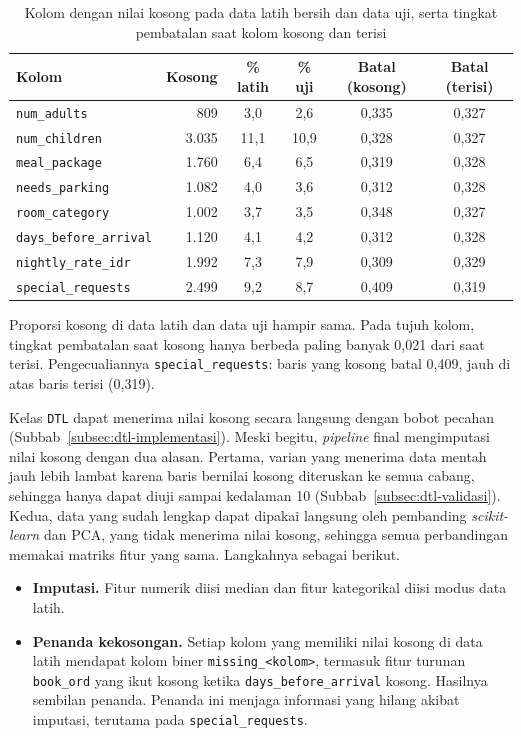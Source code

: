\begin{table}[H]
	\centering
	\caption{Kolom dengan nilai kosong pada data latih bersih dan data uji, serta tingkat pembatalan saat kolom kosong dan terisi}
	\label{tab:dtl-missing}
	\small
	\begin{tabular}{l r c c c c}
		\toprule
		\textbf{Kolom} & \textbf{Kosong} & \textbf{\% latih} & \textbf{\% uji} & \textbf{Batal (kosong)} & \textbf{Batal (terisi)} \\
		\midrule
		\texttt{num\_adults} & 809 & 3,0 & 2,6 & 0,335 & 0,327 \\
		\texttt{num\_children} & 3.035 & 11,1 & 10,9 & 0,328 & 0,327 \\
		\texttt{meal\_package} & 1.760 & 6,4 & 6,5 & 0,319 & 0,328 \\
		\texttt{needs\_parking} & 1.082 & 4,0 & 3,6 & 0,312 & 0,328 \\
		\texttt{room\_category} & 1.002 & 3,7 & 3,5 & 0,348 & 0,327 \\
		\texttt{days\_before\_arrival} & 1.120 & 4,1 & 4,2 & 0,312 & 0,328 \\
		\texttt{nightly\_rate\_idr} & 1.992 & 7,3 & 7,9 & 0,309 & 0,329 \\
		\texttt{special\_requests} & 2.499 & 9,2 & 8,7 & 0,409 & 0,319 \\
		\bottomrule
	\end{tabular}
\end{table}

Proporsi kosong di data latih dan data uji hampir sama. Pada tujuh kolom, tingkat pembatalan saat
kosong hanya berbeda paling banyak 0,021 dari saat terisi. Pengecualiannya
\texttt{special\_requests}: baris yang kosong batal 0,409, jauh di atas baris terisi (0,319).

Kelas \texttt{DTL} dapat menerima nilai kosong secara langsung dengan bobot pecahan
(Subbab~\ref{subsec:dtl-implementasi}). Meski begitu, \textit{pipeline} final mengimputasi nilai
kosong dengan dua alasan. Pertama, varian yang menerima data mentah jauh lebih lambat karena baris
bernilai kosong diteruskan ke semua cabang, sehingga hanya dapat diuji sampai kedalaman 10
(Subbab~\ref{subsec:dtl-validasi}). Kedua, data yang sudah lengkap dapat dipakai langsung oleh
pembanding \textit{scikit-learn} dan PCA, yang tidak menerima nilai kosong, sehingga semua
perbandingan memakai matriks fitur yang sama. Langkahnya sebagai berikut.
\begin{itemize}
	\item \textbf{Imputasi.} Fitur numerik diisi median dan fitur kategorikal diisi modus data latih.
	\item \textbf{Penanda kekosongan.} Setiap kolom yang memiliki nilai kosong di data latih mendapat
	kolom biner \texttt{missing\_<kolom>}, termasuk fitur turunan \texttt{book\_ord} yang ikut kosong
	ketika \texttt{days\_before\_arrival} kosong. Hasilnya sembilan penanda. Penanda ini menjaga
	informasi yang hilang akibat imputasi, terutama pada \texttt{special\_requests}.
\end{itemize}

